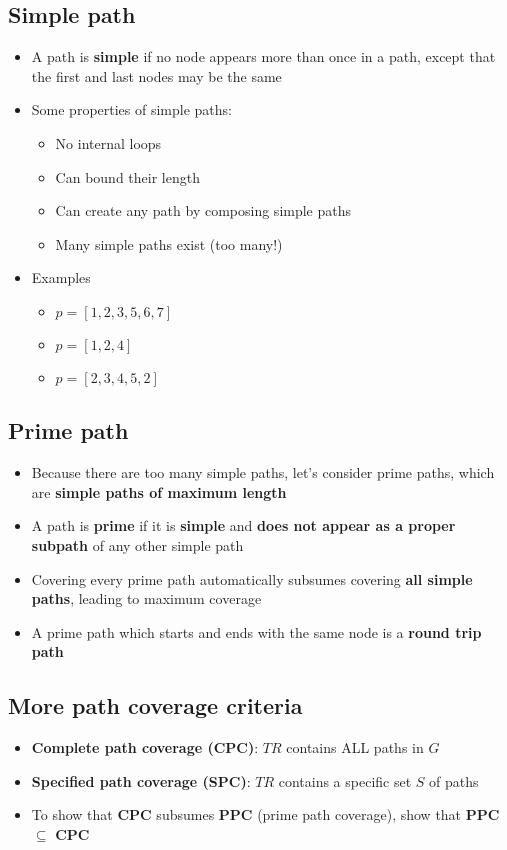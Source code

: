\documentclass[12pt]{book}
\begin{document}
\subsection{Simple path}

\begin{itemize}
  \item A path is \textbf{simple} if no node appears more than once in a path, except that the first and last nodes may be the same
  \item Some properties of simple paths:
  \begin{itemize}
    \item No internal loops
    \item Can bound their length
    \item Can create any path by composing simple paths
    \item Many simple paths exist (too many!)
  \end{itemize} 

  \item Examples
  \begin{itemize}
    \item $p=[1,2,3,5,6,7]$
    \item $p=[1,2,4]$
    \item $p=[2,3,4,5,2]$
  \end{itemize} 
\end{itemize}

\subsection{Prime path}

\begin{itemize}
  \item Because there are too many simple paths, let's consider prime paths, which are \textbf{simple paths of maximum length}
  \item A path is \textbf{prime} if it is \textbf{simple} and \textbf{does not appear as a proper subpath} of any other simple path
  \item Covering every prime path automatically subsumes covering \textbf{all simple paths}, leading to maximum coverage
  \item A prime path which starts and ends with the same node is a \textbf{round trip path}
\end{itemize}

\subsection{More path coverage criteria}

\begin{itemize}
  \item \textbf{Complete path coverage (CPC)}: $TR$ contains ALL paths in $G$
  \item \textbf{Specified path coverage (SPC)}: $TR$ contains a specific set $S$ of paths
  \item To show that \textbf{CPC} subsumes \textbf{PPC} (prime path coverage), show that \textbf{PPC} $\subseteq$ \textbf{CPC}
\end{itemize}

\end{document}
